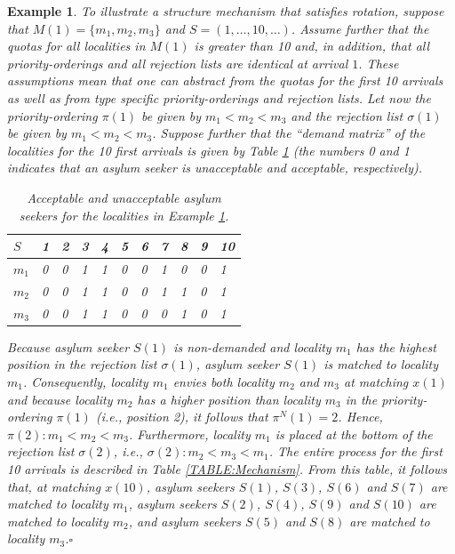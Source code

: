 \documentclass[12pt,fleqn]{article}
\newtheorem{example}{Example}
\begin{document}
\begin{example}\rm\label{EX:Mechanism}
To illustrate a structure mechanism that satisfies rotation, suppose that $M(1)=\{m_1,m_2,m_3\}$ and $S=(1,\ldots,10,\ldots)$. Assume further that the quotas for all localities in $M(1)$ is greater than 10 and, in addition, that all priority-orderings and all rejection lists are identical at arrival $1$. These assumptions mean that one can abstract from the quotas for the first 10 arrivals as well as from type specific priority-orderings and rejection lists. Let now the priority-ordering $\pi(1)$ be given by $m_1<m_2<m_3$ and the rejection list $\sigma(1)$ be given by $m_1<m_2<m_3$. Suppose further that the ``demand matrix'' of the localities for the 10 first arrivals is given by Table \ref{TABLE:Demand} (the numbers 0 and 1 indicates that an asylum seeker is unacceptable and acceptable, respectively).

\begin{table}[h!]
\caption{Acceptable and unacceptable asylum seekers for the localities in Example \ref{TABLE:Demand}.}\label{TABLE:Demand}
\begin{tabular}{lllllllllll}\hline
$S$   & 1 & 2 & 3 & 4 & 5 & 6 & 7 & 8 & 9 & 10 \\ \hline
$m_1$ & 0 & 0 & 1 & 1 & 0 & 0 & 1 & 0 & 0 & 1\\
$m_2$ & 0 & 0 & 1 & 1 & 0 & 0 & 1 & 1 & 0 & 1\\
$m_3$ & 0 & 0 & 1 & 1 & 0 & 0 & 0 & 1 & 0 & 1\\ \hline
\end{tabular}
\end{table}

\noindent Because asylum seeker $S(1)$ is non-demanded and locality $m_1$ has the highest position in the rejection list $\sigma(1)$, asylum seeker $S(1)$ is matched to locality $m_1$. Consequently, locality $m_1$ envies both locality $m_2$ and $m_3$ at matching $x(1)$ and because locality $m_2$ has a higher position than locality $m_3$ in the priority-ordering $\pi(1)$ (i.e., position 2), it follows that $\pi^N(1)=2$. Hence, $\pi(2):m_1<m_2<m_3$. Furthermore, locality $m_1$ is placed at the bottom of the rejection list $\sigma(2)$, i.e., $\sigma(2):m_2<m_3<m_1$. The entire process for the first 10 arrivals is described in Table \ref{TABLE:Mechanism}. From this table, it follows that, at matching $x(10)$, asylum seekers $S(1)$, $S(3)$, $S(6)$ and $S(7)$ are matched to locality $m_1$, asylum seekers $S(2)$, $S(4)$, $S(9)$ and $S(10)$ are matched to locality $m_2$, and asylum seekers $S(5)$ and $S(8)$ are matched to locality $m_3$.\hfill $\square$


\end{example}
\end{document}
